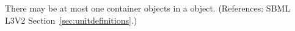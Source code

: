 There may be at most one \ListOfUnits container objects in a
\UnitDefinition object.  (References: SBML L3V2
Section~\ref{sec:unitdefinitions}.)
